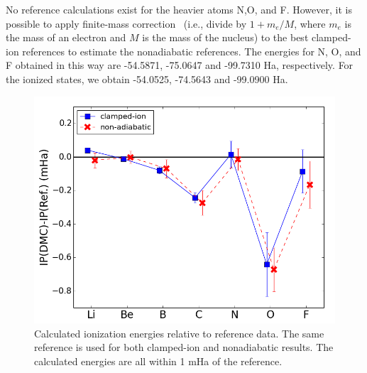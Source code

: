 \documentclass[aip,jcp,numerical,reprint]{revtex4-1}
\begin{document}
No reference calculations exist for the heavier atoms N,O, and F. However, it is possible to apply finite-mass correction~\cite{Davidson_Atoms,Cencek_LiH} (i.e., divide by $1+m_e/M$, where $m_e$ is the mass of an electron and $M$ is the mass of the nucleus) to the best clamped-ion references to estimate the nonadiabatic references. The energies for N, O, and F obtained in this way are -54.5871, -75.0647 and -99.7310 Ha, respectively. For the ionized states, we obtain -54.0525, -74.5643 and -99.0900 Ha. %

\begin{figure}[h]
\centering
\includegraphics[scale=.37]{ionization}
\caption{Calculated ionization energies relative to reference data. The same reference is used for both clamped-ion and nonadiabatic results. The calculated energies are all within 1 mHa of the reference. \label{fig:ionization}}
\end{figure}
\end{document}
